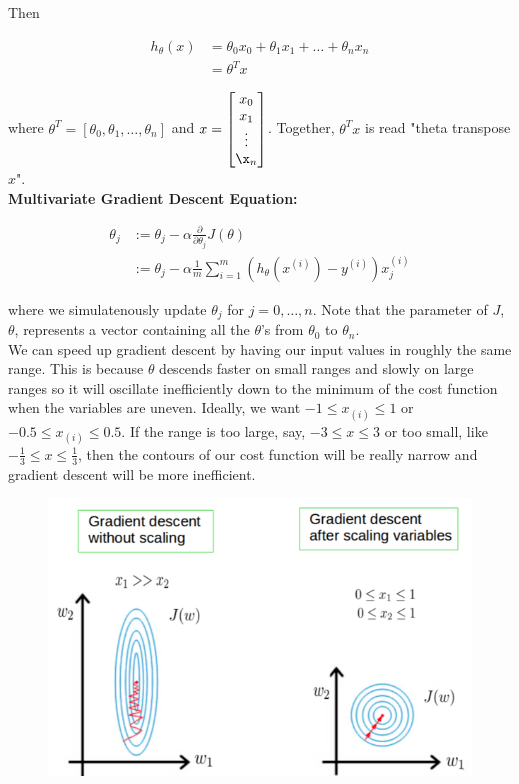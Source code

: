 \noindent Then

\begin{align*}
    h_{\theta}(x)   &= \theta_0 x_0 + \theta_1 x_1 + \dots + \theta_n x_n \\
    &= \theta^T x
\end{align*}

\noindent where $\theta^T=[\theta_0,\theta_1,\dots,\theta_n]$ and
$x=\begin{bmatrix}x_0\\x_1\\\vdots\\\x_n\end{bmatrix}$. Together, $\theta^T x$ is read
"theta transpose $x$". \\

\noindent \textbf{Multivariate Gradient Descent Equation:}

\begin{align*}
    \theta_j &:= \theta_j-\alpha\frac{\partial}{\partial\theta_j}J(\theta) \\
    &:= \theta_j-\alpha\frac{1}{m}\sum^m_{i=1}(h_\theta(x^{(i)})-y^{(i)})x_j^{(i)}
\end{align*}

\noindent where we simulatenously update $\theta_j$ for $j=0,\dots,n$. Note that the parameter of $J$,
$\theta$, represents a vector containing all the $\theta$'s from $\theta_0$ to $\theta_n$. \\

\noindent We can speed up gradient descent by having our input values in roughly the same range. This
is because $\theta$ descends faster on small ranges and slowly on large ranges so it will oscillate
inefficiently down to the minimum of the cost function when the variables are uneven. Ideally, we want
$-1\leq x_{(i)}\leq 1$ or $-0.5\leq x_{(i)}\leq 0.5$. If the range is too large, say, $-3\leq x\leq 3$
or too small, like $-\frac{1}{3}\leq x\leq\frac{1}{3}$, then the contours of our cost function will
be really narrow and gradient descent will be more inefficient.

\begin{figure}[hbt!]
    \centering
    \includegraphics[scale=0.4]{Resources/Contour3}
\end{figure}

